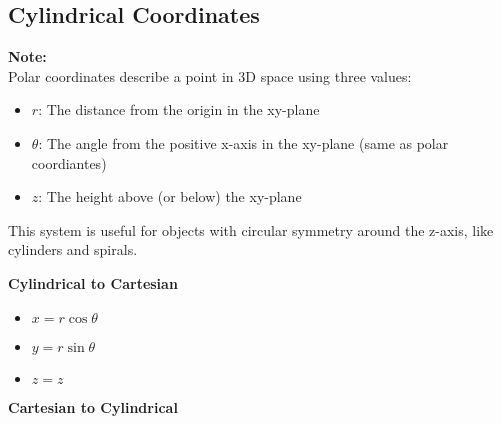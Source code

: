 \documentclass[10pt]{article}                               %
\begin{document}
\begin{adjustwidth}{2em}{0pt}
\begin{adjustwidth}{2em}{0pt}
\begin{examplebox}
\begin{adjustwidth}{2em}{0pt}
            \end{adjustwidth}
            

        \end{examplebox}


    \end{adjustwidth}


    \subsection*{Cylindrical Coordinates}

    \begin{adjustwidth}{2em}{0pt}

        \begin{notebox}

            \textbf{Note:} \\
            Polar coordinates describe a point in 3D space using three values:

            \begin{itemize}
                \item \( r \): The distance from the origin in the xy-plane
                \item \( \theta \): The angle from the positive x-axis in the xy-plane (same as polar coordiantes)
                \item \( z \): The height above (or below) the xy-plane
            \end{itemize}

            This system is useful for objects with circular symmetry around the z-axis, like cylinders and spirals.

        \end{notebox}

        \vspace{0.5em}

        \textbf{Cylindrical to Cartesian}

        \begin{itemize}
            \item \( x = r\cos\theta \)
            \item \( y = r\sin\theta \)
            \item \( z = z \)
        \end{itemize}

        \vspace{0.5em}

        \textbf{Cartesian to Cylindrical}


\end{adjustwidth}
\end{adjustwidth}
\end{document}
